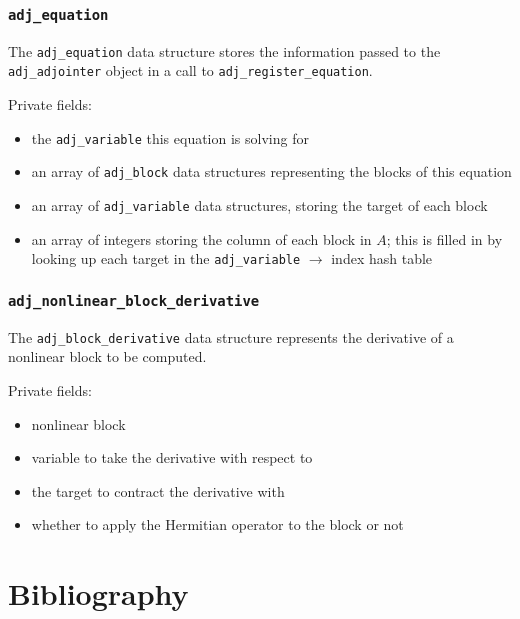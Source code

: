 \documentclass[10pt,authoryear]{elsarticle}
\begin{document}
\subsubsection{\texttt{{adj\_equation}}}
The \texttt{adj\_equation} data structure stores the information passed to the \texttt{adj\_adjointer} object
in a call to \texttt{adj\_register\_equation}.

Private fields:
\begin{itemize}
\item the \texttt{adj\_variable} this equation is solving for
\item an array of \texttt{adj\_block} data structures representing the blocks of this equation
\item an array of \texttt{adj\_variable} data structures, storing the target of each block
\item an array of integers storing the column of each block in $A$; this is filled in by
looking up each target in the \texttt{adj\_variable} $\rightarrow$ index hash table
\end{itemize}

\subsubsection{\texttt{{adj\_nonlinear\_block\_derivative}}}
The \texttt{adj\_block\_derivative} data structure represents the derivative of a nonlinear block
to be computed.

Private fields:
\begin{itemize}
\item nonlinear block
\item variable to take the derivative with respect to
\item the target to contract the derivative with
\item whether to apply the Hermitian operator to the block or not
\end{itemize}

\section*{Bibliography}


\end{document}

